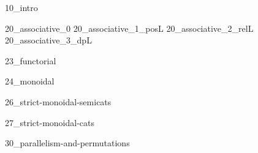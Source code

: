 
\label{chap:parallelism}
{10_intro}

{20_associative_0}
{20_associative_1_posL}
{20_associative_2_relL}
{20_associative_3_dpL}

{23_functorial}

{24_monoidal}

{26_strict-monoidal-semicats}

{27_strict-monoidal-cats}

{30_parallelism-and-permutations}


